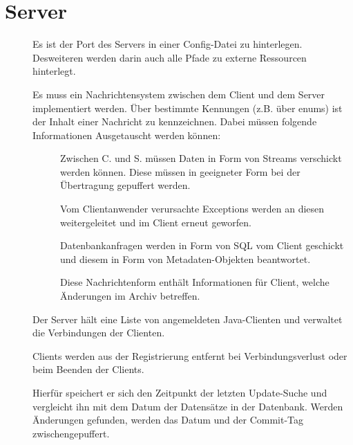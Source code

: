 \section{Server} \label{spec:server}
\begin{description}
	\item []
		Es ist der Port des Servers in einer Config-Datei zu hinterlegen.
		Desweiteren werden darin auch alle Pfade zu externe Ressourcen
		hinterlegt.
	\item []
		Es muss ein Nachrichtensystem zwischen dem Client und dem Server implementiert werden.
		Über bestimmte Kennungen (z.B. über enums) ist der Inhalt einer Nachricht zu kennzeichnen.
		Dabei müssen folgende Informationen Ausgetauscht werden können:
		\begin{description}
			\item []
				Zwischen C. und S. müssen Daten in Form von Streams verschickt werden können.
				Diese müssen in geeigneter Form bei der Übertragung gepuffert werden.
			\item []
				Vom Clientanwender verursachte Exceptions werden an diesen weitergeleitet und 
				im Client erneut geworfen.
			\item []
				Datenbankanfragen werden in Form von SQL vom Client geschickt und diesem
				in Form von Metadaten-Objekten beantwortet.
			\item []
				Diese Nachrichtenform enthält Informationen für Client, welche Änderungen im Archiv betreffen.
		\end{description}
	\item []
		Der Server hält eine Liste von angemeldeten Java-Clienten und 
		verwaltet die Verbindungen der Clienten.
	\item []
		Clients werden aus der Registrierung entfernt bei Verbindungsverlust oder 
		beim Beenden der Clients. 
	\item []
		Hierfür speichert er sich den Zeitpunkt der letzten Update-Suche und 
		vergleicht ihn mit dem Datum der Datensätze in der Datenbank.
		Werden Änderungen gefunden, werden das Datum und der Commit-Tag zwischengepuffert.
		\begin{description}
			\item []

\end{description}
\end{description}
